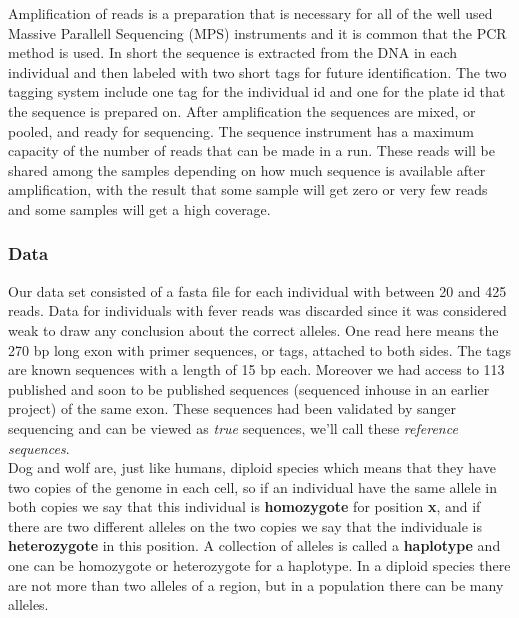 Amplification of reads is a preparation that is necessary for all of the well used Massive Parallell Sequencing ({MPS}) instruments \cite{NextGen} and it is common that the {PCR} method \cite{pcr} is used. In short the sequence is extracted from the {DNA} in each individual and then labeled with two short tags for future identification. The two tagging system include one tag for the individual id and one for the plate id that the sequence is prepared on. After amplification the sequences are mixed, or pooled, and ready for sequencing. The sequence instrument has a maximum capacity of the number of reads that can be made in a run. These reads will be shared among the samples depending on how much sequence is available after amplification, with the result that some sample will get zero or very few reads and some samples will get a high coverage.\\

\subsubsection{Data}


Our data set consisted of a fasta file for each individual with between 20 and 425 reads. Data for individuals with fever reads was discarded since it was considered weak to draw any conclusion about the correct alleles. One read here means the 270 bp long exon with primer sequences, or tags, attached to both sides. The tags are known sequences with a length of 15 bp each. 
Moreover we had access to 113 published and soon to be published sequences (sequenced inhouse in an earlier project) of the same exon. These sequences had been validated by sanger sequencing \cite{sanger} and can be viewed as \emph{true} sequences, we'll call these \emph{reference sequences}.\\

Dog and wolf are, just like humans, diploid species which means that they have two copies of the genome in each cell, so if an individual have the same allele in both copies we say that this individual is \textbf{homozygote} for position \textbf{x}, and if there are two different alleles on the two copies we say that the individuale is \textbf{heterozygote} in this position. A collection of alleles is called a \textbf{haplotype} and one can be homozygote or heterozygote for a haplotype. In a diploid species there are not more than two alleles of a region, but in a population there can be many alleles.\\

